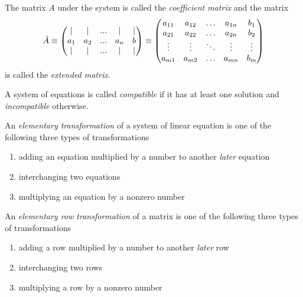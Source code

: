 \documentclass{article}
\begin{document}
    \begin{definition}
      The matrix $A$ under the system is called the \textit{coefficient matrix} and the matrix 
      \begin{equation}
        \Tilde{A} \equiv \begin{pmatrix}
        | & | & ... & | & | \\
        a_1 & a_2 & ... & a_n & b \\
        | & | & ... & | & | 
        \end{pmatrix} \equiv \begin{pmatrix}
        a_{1 1} & a_{1 2} & \ldots& a_{1 n} & b_1\\
         a_{2 1} & a_{2 2} & \ldots & a_{2 n} & b_2\\
        \vdots & \vdots & \ddots & \vdots & \vdots\\
         a_{m 1} & a_{m 2} & \ldots & a_{m n} & b_m
        \end{pmatrix}
      \end{equation}
      is called the \textit{extended matrix}. 
    \end{definition}

    \begin{definition}
      A system of equations is called \textit{compatible} if it has at least one solution and \textit{incompatible} otherwise. 
    \end{definition}

    \begin{definition}
      An \textit{elementary transformation} of a system of linear equation is one of the following three types of transformations
      \begin{enumerate}
        \item adding an equation multiplied by a number to another \textit{later} equation
        \item interchanging two equations
        \item multiplying an equation by a nonzero number
      \end{enumerate}
    \end{definition}

    \begin{definition}
      An \textit{elementary row transformation} of a matrix is one of the following three types of transformations
      \begin{enumerate}
        \item adding a row multiplied by a number to another \textit{later} row
        \item interchanging two rows
        \item multiplying a row by a nonzero number
      \end{enumerate}
    \end{definition}
\end{document}
